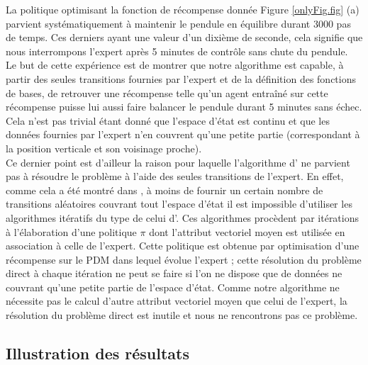 \documentclass[publibook-draft]{CAp2012}
\begin{document}
La politique optimisant la fonction de récompense donnée Figure \ref{onlyFig.fig} (a) parvient systématiquement à maintenir le pendule en équilibre durant 3000 pas de temps. Ces derniers ayant une valeur d'un dixième de seconde, cela signifie que nous interrompons l'expert après 5 minutes de contrôle sans chute du pendule.\\

Le but de cette expérience est de montrer que notre algorithme est capable, à partir des seules transitions fournies par l'expert et de la définition des fonctions de bases, de retrouver une récompense telle qu'un agent entraîné sur cette récompense puisse lui aussi faire balancer le pendule durant 5 minutes sans échec. Cela n'est pas trivial étant donné que l'espace d'état est continu et que les données fournies par l'expert n'en couvrent qu'une petite partie (correspondant à la position verticale et son voisinage proche).\\

 Ce dernier point est d'ailleur la raison pour laquelle l'algorithme d'\citet{abbeel2004apprenticeship} ne parvient pas à résoudre le problème à l'aide des seules transitions de l'expert.
En effet, comme cela a été montré dans \citep{klein2011batch}, à moins de fournir un certain nombre de transitions aléatoires couvrant tout l'espace d'état il est impossible d'utiliser les algorithmes itératifs du type de celui d'\citet{abbeel2004apprenticeship}. Ces algorithmes procèdent par itérations à l'élaboration d'une politique $\pi$ dont l'attribut vectoriel moyen est utilisée en association à celle de l'expert. Cette politique est obtenue par optimisation d'une récompense sur le PDM dans lequel évolue l'expert ; cette résolution du problème direct à chaque itération ne peut se faire si l'on ne dispose que de données ne couvrant qu'une petite partie de l'espace d'état. Comme notre algorithme ne nécessite pas le calcul d'autre attribut vectoriel moyen que celui de l'expert, la résolution du problème direct est inutile et nous ne rencontrons pas ce problème.
\subsection{Illustration des résultats}
\end{document}
